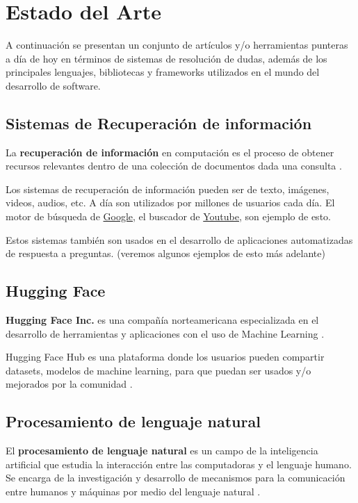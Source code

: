 \chapter{Estado del Arte}\label{chapter:state-of-the-art}

A continuación se presentan un conjunto de artículos y/o herramientas punteras a día de hoy en términos de sistemas de resolución de dudas, además de los principales lenguajes, bibliotecas y frameworks utilizados en el mundo del desarrollo de software.

\section{Sistemas de Recuperación de información}

La \textbf{recuperación de información} en computación es el proceso de obtener recursos relevantes dentro de una colección de documentos dada una consulta \cite{ir}.
\newline

Los sistemas de recuperación de información pueden ser de texto, imágenes, videos, audios, etc. A día son utilizados por millones de usuarios cada día. El motor de búsqueda de \href{google.com}{Google}, el buscador de \href{youtube.com}{Youtube}, son ejemplo de esto.
\newline

Estos sistemas también son usados en el desarrollo de aplicaciones automatizadas de respuesta a preguntas. (veremos algunos ejemplos de esto más adelante)

\section{Hugging Face}

\textbf{Hugging Face Inc.} es una compañía norteamericana especializada en el desarrollo de herramientas y aplicaciones con el uso de Machine Learning \cite{hugging_face}.
\newline

Hugging Face Hub es una plataforma donde los usuarios pueden compartir datasets, modelos de machine learning, para que puedan ser usados y/o mejorados por la comunidad \cite{hugging_face_hub}.

\section{Procesamiento de lenguaje natural}

El \textbf{procesamiento de lenguaje natural} es un campo de la inteligencia artificial que estudia la interacción entre las computadoras y el lenguaje humano. Se encarga de la investigación y desarrollo de mecanismos para la comunicación entre humanos y máquinas por medio del lenguaje natural \cite{nlp}.
\newline

